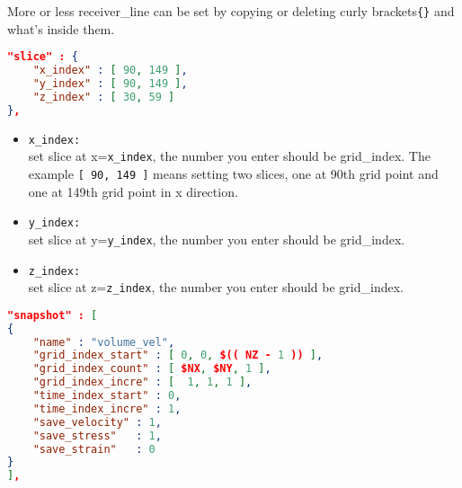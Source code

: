 More or less receiver\_line can be set by copying or deleting curly brackets\verb|{}| and what's inside them.
\begin{lstlisting}[language=json,
	caption=Example of setting slice,
	label={slice},commentstyle=\color{codegreen},
	frame=tb]	 
"slice" : {
	"x_index" : [ 90, 149 ],
	"y_index" : [ 90, 149 ],
	"z_index" : [ 30, 59 ]
},
\end{lstlisting}
\begin{itemize}
	\item \verb|x_index:| \\
	set slice at x=\verb|x_index|, the number you enter should be grid\_index. The example \verb|[ 90, 149 ]| means setting two slices, one at 90th grid point and one at 149th grid point in x direction.
	\item \verb|y_index:| \\
	set slice at y=\verb|y_index|, the number you enter should be grid\_index.
	\item \verb|z_index:| \\
	set slice at z=\verb|z_index|, the number you enter should be grid\_index. 
\end{itemize}
\begin{lstlisting}[language=json,
	caption=Example of setting snapshot,
	label={snap},commentstyle=\color{codegreen},
	frame=tb]
"snapshot" : [
{
	"name" : "volume_vel",
	"grid_index_start" : [ 0, 0, $(( NZ - 1 )) ],
	"grid_index_count" : [ $NX, $NY, 1 ],
	"grid_index_incre" : [  1, 1, 1 ],
	"time_index_start" : 0,
	"time_index_incre" : 1,
	"save_velocity" : 1,
	"save_stress"   : 1,
	"save_strain"   : 0
}
],
\end{lstlisting}	
